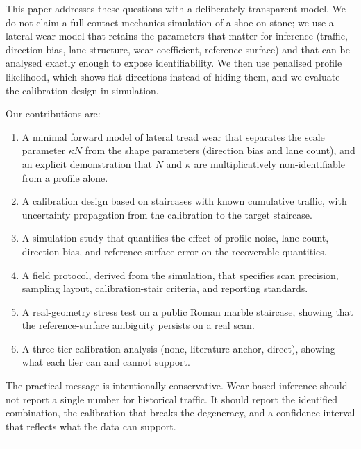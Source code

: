 \documentclass[
]{article}
\newcounter{none} %
\providecommand{\tightlist}{%
  \setlength{\itemsep}{0pt}\setlength{\parskip}{0pt}}
\begin{document}
This paper addresses these questions with a deliberately transparent
model. We do not claim a full contact-mechanics simulation of a shoe on
stone; we use a lateral wear model that retains the parameters that
matter for inference (traffic, direction bias, lane structure, wear
coefficient, reference surface) and that can be analysed exactly enough
to expose identifiability. We then use penalised profile likelihood,
which shows flat directions instead of hiding them, and we evaluate the
calibration design in simulation.

Our contributions are:

\begin{enumerate}
\def\labelenumi{\arabic{enumi}.}
\tightlist
\item
  A minimal forward model of lateral tread wear that separates the scale
  parameter \(\kappa N\) from the shape parameters (direction bias and
  lane count), and an explicit demonstration that \(N\) and \(\kappa\)
  are multiplicatively non-identifiable from a profile alone.
\item
  A calibration design based on staircases with known cumulative
  traffic, with uncertainty propagation from the calibration to the
  target staircase.
\item
  A simulation study that quantifies the effect of profile noise, lane
  count, direction bias, and reference-surface error on the recoverable
  quantities.
\item
  A field protocol, derived from the simulation, that specifies scan
  precision, sampling layout, calibration-stair criteria, and reporting
  standards.
\item
  A real-geometry stress test on a public Roman marble staircase,
  showing that the reference-surface ambiguity persists on a real scan.
\item
  A three-tier calibration analysis (none, literature anchor, direct),
  showing what each tier can and cannot support.
\end{enumerate}

The practical message is intentionally conservative. Wear-based
inference should not report a single number for historical traffic. It
should report the identified combination, the calibration that breaks
the degeneracy, and a confidence interval that reflects what the data
can support.

\begin{center}\rule{0.5\linewidth}{0.5pt}\end{center}
\end{document}
